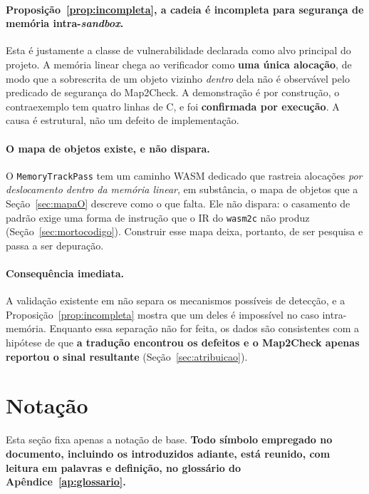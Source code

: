 \documentclass[11pt,a4paper]{article}
\theoremstyle{definition}
\newcommand{\code}[1]{\texttt{#1}}
\begin{document}
\paragraph{Proposição~\ref{prop:incompleta}, a cadeia é incompleta para
segurança de memória intra-\emph{sandbox}.}
Esta é justamente a classe de vulnerabilidade declarada como alvo principal do
projeto. A memória linear chega ao verificador como \textbf{uma única alocação},
de modo que a sobrescrita de um objeto vizinho \emph{dentro} dela não é observável
pelo predicado de segurança do Map2Check. A demonstração é por construção, o
contraexemplo tem quatro linhas de C, e foi \textbf{confirmada por execução}. A
causa é estrutural, não um defeito de implementação.

\paragraph{O mapa de objetos existe, e não dispara.}
O \code{MemoryTrackPass} tem um
caminho WASM dedicado que rastreia alocações \emph{por deslocamento dentro da
memória linear}, em substância, o mapa de objetos que a Seção~\ref{sec:mapaO}
descreve como o que falta. Ele não dispara: o casamento de padrão exige uma forma
de instrução que o IR do \code{wasm2c} não produz
(Seção~\ref{sec:mortocodigo}). Construir esse mapa deixa, portanto, de ser
pesquisa e passa a ser depuração.

\paragraph{Consequência imediata.}
A validação existente em  não separa
os mecanismos possíveis de detecção, e a Proposição~\ref{prop:incompleta} mostra
que um deles é impossível no caso intra-memória. Enquanto essa separação não for
feita, os dados são consistentes com a hipótese de que \textbf{a tradução
encontrou os defeitos e o Map2Check apenas reportou o sinal resultante}
(Seção~\ref{sec:atribuicao}).

\section{Notação}

Esta seção fixa apenas a notação de base. \textbf{Todo símbolo empregado no
documento, incluindo os introduzidos adiante, está reunido, com leitura em
palavras e definição, no glossário do Apêndice~\ref{ap:glossario}.}
\end{document}
